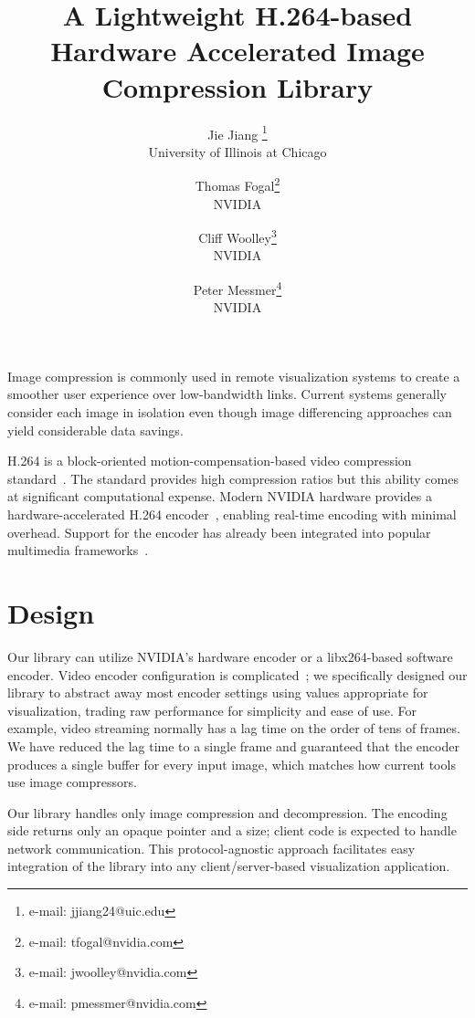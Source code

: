\documentclass[review]{vgtc}                 %
\title{A Lightweight H.264-based Hardware Accelerated Image Compression Library}
\author{Jie Jiang \thanks{e-mail: jjiang24@uic.edu}\\ %
        \scriptsize University of Illinois at Chicago %
\and Thomas Fogal\thanks{e-mail: tfogal@nvidia.com}\\ %
     \scriptsize NVIDIA %
\and Cliff Woolley\thanks{e-mail: jwoolley@nvidia.com}\\ %
     \scriptsize NVIDIA %
\and Peter Messmer\thanks{e-mail: pmessmer@nvidia.com}\\ %
     \scriptsize NVIDIA} %
\begin{document}


\maketitle

Image compression is commonly used in remote visualization systems to
create a smoother user experience over low-bandwidth links. Current
systems generally consider each image in isolation even though image
differencing approaches can yield considerable data savings.

H.264 is a block-oriented motion-compensation-based video compression
standard~\cite{wiegand2003overview}. The standard provides high
compression ratios but this ability comes at significant computational
expense.  Modern NVIDIA hardware provides a hardware-accelerated H.264
encoder~\cite{nvcodec}, enabling real-time encoding with
minimal overhead. Support for the encoder has already been
integrated into popular multimedia frameworks~\cite{ffmpeg}.

\section{Design}

Our library can utilize NVIDIA's hardware encoder or a libx264-based
software encoder. Video encoder configuration is
complicated~\cite{wiegand2003overview}; we specifically designed our
library to abstract away most encoder settings using values appropriate
for visualization, trading raw performance for simplicity and ease of
use.  For example, video streaming normally has a lag time on the order
of tens of frames. We have reduced the lag time to a single frame and
guaranteed that the encoder produces a single buffer for every input
image, which matches how current tools~\cite{Ayachit:2015:ParaView,
Childs:2011:VisIt} use image compressors.

Our library handles only image compression and decompression.  The
encoding side returns only an opaque pointer and a size; client code
is expected to handle network communication.  This protocol-agnostic
approach facilitates easy integration of the library into any
client/server-based visualization application.
\end{document}
